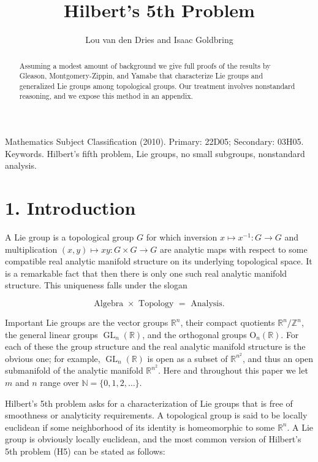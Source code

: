 \documentclass[10pt]{article}
\title{Hilbert's 5th Problem }
\author{Lou van den Dries and Isaac Goldbring}
\date{}
\begin{document}
\maketitle


\begin{abstract}
Assuming a modest amount of background we give full proofs of the results by Gleason, Montgomery-Zippin, and Yamabe that characterize Lie groups and generalized Lie groups among topological groups. Our treatment involves nonstandard reasoning, and we expose this method in an appendix.
\end{abstract}

Mathematics Subject Classification (2010). Primary: 22D05; Secondary: 03H05.\\
Keywords. Hilbert's fifth problem, Lie groups, no small subgroups, nonstandard analysis.

\section*{1. Introduction}
A Lie group is a topological group $G$ for which inversion $x \mapsto x^{-1}: G \rightarrow G$ and multiplication $(x, y) \mapsto x y: G \times G \rightarrow G$ are analytic maps with respect to some compatible real analytic manifold structure on its underlying topological space. It is a remarkable fact that then there is only one such real analytic manifold structure. This uniqueness falls under the slogan

$$
\text { Algebra } \times \text { Topology }=\text { Analysis. }
$$

Important Lie groups are the vector groups $\mathbb{R}^{n}$, their compact quotients $\mathbb{R}^{n} / \mathbb{Z}^{n}$, the general linear groups $\operatorname{GL}_{n}(\mathbb{R})$, and the orthogonal groups $\mathrm{O}_{n}(\mathbb{R})$. For each of these the group structure and the real analytic manifold structure is the obvious one; for example, $\operatorname{GL}_{n}(\mathbb{R})$ is open as a subset of $\mathbb{R}^{n^{2}}$, and thus an open submanifold of the analytic manifold $\mathbb{R}^{n^{2}}$. Here and throughout this paper we let $m$ and $n$ range over $\mathbb{N}=\{0,1,2, \ldots\}$.

Hilbert's 5th problem asks for a characterization of Lie groups that is free of smoothness or analyticity requirements. A topological group is said to be locally euclidean if some neighborhood of its identity is homeomorphic to some $\mathbb{R}^{n}$. A Lie group is obviously locally euclidean, and the most common version of Hilbert's 5th problem (H5) can be stated as follows:
\end{document}
